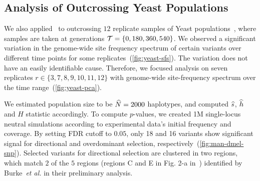 
\subsection{Analysis of Outcrossing Yeast Populations}
We also applied \comale\ to outcrossing $12$ replicate samples of
Yeast populations~\cite{burke2014standing}, where samples are taken at
generations ${\cal T}=\{0,180,360,540\}$. We observed a significant
variation in the genome-wide site frequency spectrum of certain
variants over different time points for some
replicates~(\ref{fig:yeast-sfs}). The variation does not have an
easily identifiable cause. Therefore, we focused analysis on seven
replicates $r\in\{3,7,8,9,10,11,12\}$ with genome-wide site-frequency
spectrum over the time range~(\ref{fig:yeast-pca}).

We estimated population size to be $\widehat{N}=2000$ haplotypes, and computed
$\widehat{s}$, $\widehat{h}$ and $H$ statistic accordingly. To compute $p$-values, we
created 1M single-locus neutral simulations according to experimental
data's initial frequency and coverage. By setting FDR cutoff to
$0.05$, only 18 and 16 variants show significant signal for
directional and overdominant selection,
respectively~(\ref{fig:man-dmel-snp}).  Selected variants for
directional selection are clustered in two regions, which match $2$ of
the $5$ regions (regions C and E in Fig. 2-a
in~\cite{burke2014standing}) identified by Burke~\emph{et al.} in
their preliminary analysis.  

